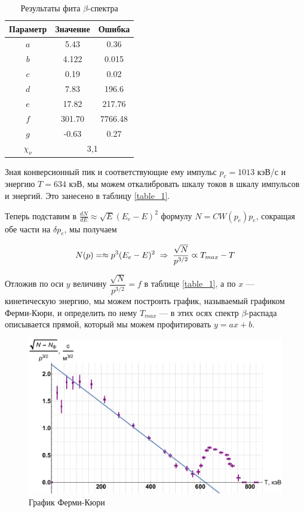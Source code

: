 \documentclass[12pt]{kiarticle} %
\newcommand{\be}{\ensuremath{\beta}}
\begin{document}
	\begin{table}[H]
		\caption{Результаты фита \be-спектра}
		\label{fit}
		\begin{center}
		\begin{tabular}{|c|c|c|}
			\hline
			Параметр & Значение & Ошибка \\
		\hline 
	$ a $&5.43 & 0.36 \\
	$ b $&4.122 & 0.015 \\
	$ c $&0.19 & 0.02\\
	$ d $&7.83 & 196.6 \\
	$ e $&17.82 & 217.76 \\
	$ f $&301.70 & 7766.48 \\
	$ g $&-0.63 & 0.27 \\
	\hline
	$ \chi_\nu $ & \multicolumn{2}{|c|}{3,1}  \\
	\hline
	\end{tabular}
	\end{center} 
	\end{table}

	Зная конверсионный пик и соответствующие ему импульс $ p_c = 1013 $ кэВ/$ с $ и энергию $ T = 634 $ кэВ, мы можем откалибровать шкалу токов в шкалу импульсов и энергий. Это занесено в таблицу \ref{table_1}.

	Теперь подставим в $\frac{dN}{dE}\approx\sqrt{E}(E_e-E)^2$ формулу $N=CW(p_e)p_e$, сокращая обе части на $ \delta  p_e $, мы получаем 

	\begin{equation}\label{}
	N(p) = \approx p^3 (E_e - E)^2 \; \Rightarrow \; \dfrac{\sqrt{N}}{p^{3/2}} \varpropto T_{max} - T
	\end{equation}

	Отложив по оси $ y $ величину $ \dfrac{\sqrt{N}}{p^{3/2}} = f $ в таблице \ref{table_1}, а по $ x $ --- кинетическую энергию, мы можем построить график, называемый графиком Ферми-Кюри, и определить по нему $ T_{max} $ --- в этих осях спектр \be-распада описывается прямой, который мы можем профитировать $ y = ax +b $.

		\begin{figure}[H]
		\label{graf_kk}
		\includegraphics[scale=0.47]{kk.pdf}
		\caption{График Ферми-Кюри}
	\end{figure}
\end{document}
